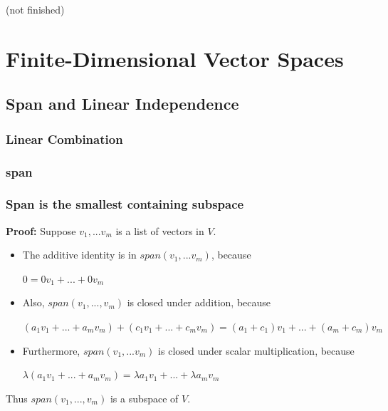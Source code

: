 \documentclass{report}
\begin{document}
(not finished)
 

\chapter{Finite-Dimensional Vector Spaces}
\section{Span and Linear Independence}
\subsection{Linear Combination}
\subsection{span}
\subsection{Span is the smallest containing subspace}
\textbf{Proof:}\newline
Suppose $v_1,...v_m$ is a list of vectors in $V$.
\begin{itemize}
    \item The additive identity is in $span(v_1,...v_m)$, because\newline
        \centerline{$0=0v_1+...+0v_m$}
    \item Also, $span(v_1,...,v_m)$ is closed under addition, because\newline
        \centerline{$(a_1v_1+...+a_mv_m)+(c_1v_1+...+c_mv_m)=(a_1+c_1)v_1+...+(a_m+c_m)v_m$}
    \item Furthermore, $span(v_1,...v_m)$ is closed under scalar multiplication, because\newline
        \centerline{$\lambda(a_1v_1+...+a_mv_m)=\lambda a_1v_1+...+\lambda a_mv_m$}
\end{itemize}
Thus $span(v_1,...,v_m)$ is a subspace of $V$.\newline
\end{document}
